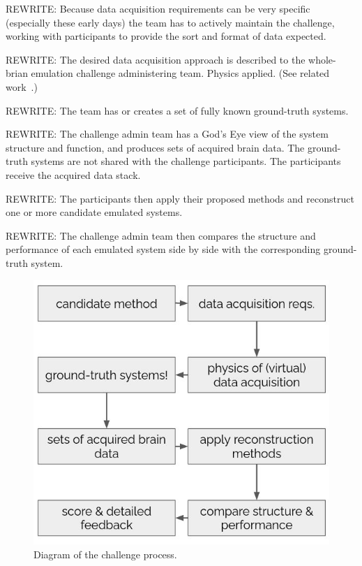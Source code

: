 \documentclass{ldr-article}
\begin{document}
\alert{REWRITE:} Because data acquisition requirements can be very specific (especially these early days) the team has to actively maintain the challenge, working with participants to provide the sort and format of data expected.

\alert{REWRITE:} The desired data acquisition approach is described to the whole-brian emulation challenge administering team. Physics applied. (See related work~\cite{aberra2018}.)

\alert{REWRITE:} The team has or creates a set of fully known ground-truth systems.

\alert{REWRITE:} The challenge admin team has a God’s Eye view of the system structure and function, and produces sets of acquired brain data. The ground-truth systems are not shared with the challenge participants. The participants receive the acquired data stack.

\alert{REWRITE:} The participants then apply their proposed methods and reconstruct one or more candidate emulated systems.

\alert{REWRITE:} The challenge admin team then compares the structure and performance of each emulated system side by side with the corresponding ground-truth system.

\begin{figure}
	\centering
	\includegraphics[width=1\linewidth]{figures/challenge-process.jpg}
	\caption{Diagram of the challenge process.}
	\label{fig:challenge-process}
\end{figure}
\end{document}
